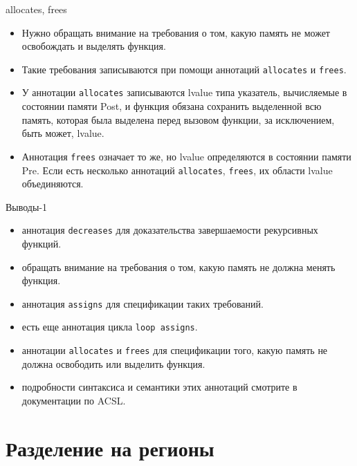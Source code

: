 \documentclass[hyperref={unicode=true}]{beamer}
\begin{document}
    \begin{frame}{allocates, frees}
    \begin{itemize}
    \item Нужно обращать внимание на требования о том, какую память не может освобождать и выделять функция.
    \item Такие требования записываются при помощи аннотаций \texttt{allocates} и \texttt{frees}.
    \item У аннотации \texttt{allocates} записываются lvalue типа указатель, вычисляемые в состоянии памяти Post, и функция обязана сохранить
    выделенной всю память, которая была выделена перед вызовом функции, за исключением, быть может, lvalue.
    \item Аннотация \texttt{frees} означает то же, но lvalue определяются в состоянии памяти Pre. Если есть несколько аннотаций \texttt{allocates},
    \texttt{frees}, их области lvalue объединяются.
    \end{itemize}
    \end{frame}

    \begin{frame}{Выводы-1}
    \begin{itemize}
    \item аннотация \texttt{decreases} для доказательства завершаемости рекурсивных функций.
    \item обращать внимание на требования о том, какую память не должна менять функция.
    \item аннотация \texttt{assigns} для спецификации таких требований.
    \item есть еще аннотация цикла \texttt{loop assigns}.
    \item аннотации \texttt{allocates} и \texttt{frees} для спецификации того, какую память не должна освободить или выделить функция.
    \item подробности синтаксиса и семантики этих аннотаций смотрите в документации по ACSL.
    \end{itemize}
    \end{frame}

    \section{Разделение на регионы}
\end{document}
